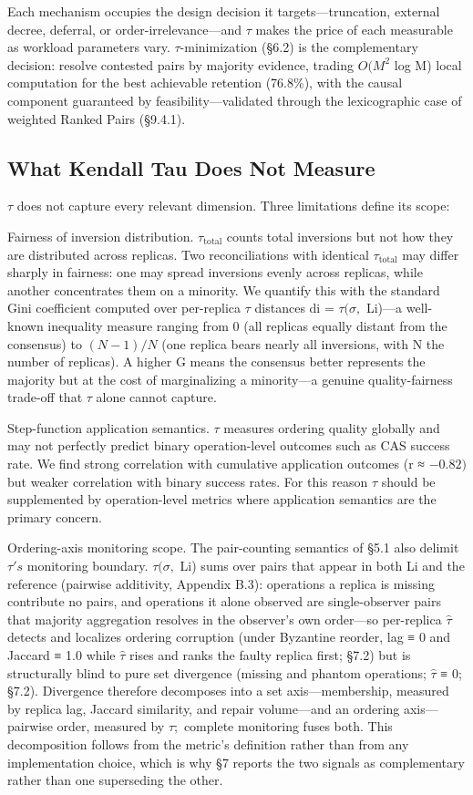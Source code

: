 \documentclass[10pt,twocolumn]{article}
\begin{document}
Each mechanism occupies the design decision it targets—truncation, external decree, deferral, or order-irrelevance—and $\tau$ makes the price of each measurable as workload parameters vary. $\tau$-minimization (§6.2) is the complementary decision: resolve contested pairs by majority evidence, trading $O(M^{2}$ log M) local computation for the best achievable retention (76.8\%), with the causal component guaranteed by feasibility—validated through the lexicographic case of weighted Ranked Pairs (§9.4.1).

\subsection{What Kendall Tau Does Not Measure}
$\tau$ does not capture every relevant dimension. Three limitations define its scope:

Fairness of inversion distribution. $\tau_{\mathrm{total}}$ counts total inversions but not how they are distributed across replicas. Two reconciliations with identical $\tau_{\mathrm{total}}$ may differ sharply in fairness: one may spread inversions evenly across replicas, while another concentrates them on a minority. We quantify this with the standard Gini coefficient computed over per-replica $\tau$ distances di = $\tau(\sigma,$ Li)—a well-known inequality measure ranging from 0 (all replicas equally distant from the consensus) to $(N-1)/N$ (one replica bears nearly all inversions, with N the number of replicas). A higher G means the consensus better represents the majority but at the cost of marginalizing a minority—a genuine quality-fairness trade-off that $\tau$ alone cannot capture.

Step-function application semantics. $\tau$ measures ordering quality globally and may not perfectly predict binary operation-level outcomes such as CAS success rate. We find strong correlation with cumulative application outcomes (r ≈ $-0.82)$ but weaker correlation with binary success rates. For this reason $\tau$ should be supplemented by operation-level metrics where application semantics are the primary concern.

Ordering-axis monitoring scope. The pair-counting semantics of §5.1 also delimit $\tau's$ monitoring boundary. $\tau(\sigma,$ Li) sums over pairs that appear in both Li and the reference (pairwise additivity, Appendix B.3): operations a replica is missing contribute no pairs, and operations it alone observed are single-observer pairs that majority aggregation resolves in the observer's own order—so per-replica $\hat{\tau}$ detects and localizes ordering corruption (under Byzantine reorder, lag ≡ 0 and Jaccard ≡ 1.0 while $\hat{\tau}$ rises and ranks the faulty replica first; §7.2) but is structurally blind to pure set divergence (missing and phantom operations; $\hat{\tau}$ ≡ 0; §7.2). Divergence therefore decomposes into a set axis—membership, measured by replica lag, Jaccard similarity, and repair volume—and an ordering axis—pairwise order, measured by $\tau;$ complete monitoring fuses both. This decomposition follows from the metric's definition rather than from any implementation choice, which is why §7 reports the two signals as complementary rather than one superseding the other.
\end{document}
